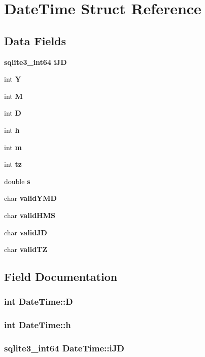 \section{Date\-Time Struct Reference}
\label{structDateTime}
\subsection*{Data Fields}
\begin{CompactItemize}
\item 
\bf{sqlite3\_\-int64} \bf{i\-JD}
\item 
int \bf{Y}
\item 
int \bf{M}
\item 
int \bf{D}
\item 
int \bf{h}
\item 
int \bf{m}
\item 
int \bf{tz}
\item 
double \bf{s}
\item 
char \bf{valid\-YMD}
\item 
char \bf{valid\-HMS}
\item 
char \bf{valid\-JD}
\item 
char \bf{valid\-TZ}
\end{CompactItemize}


\subsection{Field Documentation}
\subsubsection{\setlength{\rightskip}{0pt plus 5cm}int \bf{Date\-Time::D}}\label{structDateTime_5864f4680a9d8e5e26fb9347ad751fbf}


\subsubsection{\setlength{\rightskip}{0pt plus 5cm}int \bf{Date\-Time::h}}\label{structDateTime_b39474f80954dc7968825da328177f1c}


\subsubsection{\setlength{\rightskip}{0pt plus 5cm}\bf{sqlite3\_\-int64} \bf{Date\-Time::i\-JD}}\label{structDateTime_53e8e9d02dfed4f2532a1c9c4d009417}


